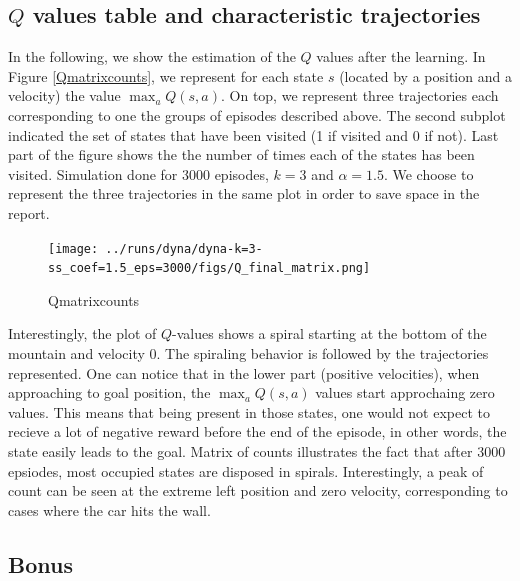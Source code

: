 \documentclass[a4paper, 12pt,oneside]{article}
\begin{document}
        \subsection{$Q$ values table and characteristic trajectories}
        In the following, we show the estimation of the $Q$ values after the learning. In Figure \ref{Qmatrixcounts}, we represent for each state $s$ (located by a position and a velocity) the value $\max_a Q(s,a)$. On top, we represent three trajectories each corresponding to one the groups of episodes described above. 
        The second subplot indicated the set of states that have been visited (1 if visited and 0 if not). Last part of the figure shows the the number of times each of the states has been visited. Simulation done for 3000 episodes, $k=3$ and $\alpha=1.5$.
        We choose to represent the three trajectories in the same plot in order to save space in the report.

        \begin{figure}[h]
            \centering
            \texttt{[image: ../runs/dyna/dyna-k=3-ss\_coef=1.5\_eps=3000/figs/Q\_final\_matrix.png]}
            \caption{Qmatrixcounts}
        \end{figure}

        Interestingly, the plot of $Q$-values shows a spiral starting at the bottom of the mountain and velocity 0. The spiraling behavior is followed by the trajectories represented. One can notice that in the lower part (positive velocities), when approaching to goal position, the $\max_a Q(s,a)$ values start approchaing zero values. This means that being present in those states, one would not expect to recieve a lot of negative reward before the end of the episode, in other words, the state easily leads to the goal.  
        Matrix of counts illustrates the fact that after 3000 epsiodes, most occupied states are disposed in spirals. Interestingly, a peak of count can be seen at the extreme left position and zero velocity, corresponding to cases where the car hits the wall. 

        

        \subsection{Bonus}
\end{document}
